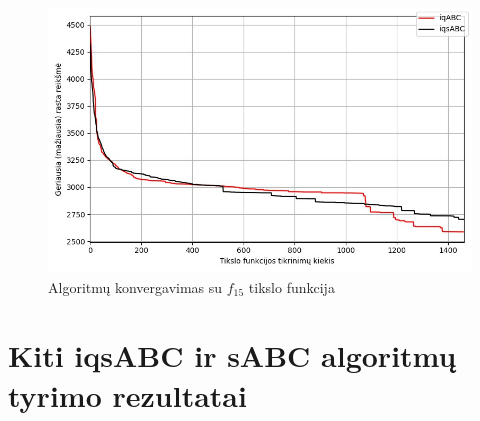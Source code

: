 \documentclass{VUMIFKompMagistrinis}
\begin{document}
\begin{landscape}
\begin{figure}[H]
    \centering
    \includegraphics[scale=0.5]{img/2kg/f15.jpg}
    \caption{Algoritmų konvergavimas su $f_{15}$ tikslo funkcija}
    \label{img:vkonf15}
\end{figure}

\end{landscape}








\section{Kiti iqsABC ir sABC algoritmų tyrimo rezultatai}\label{PR2eff}
\end{document}
